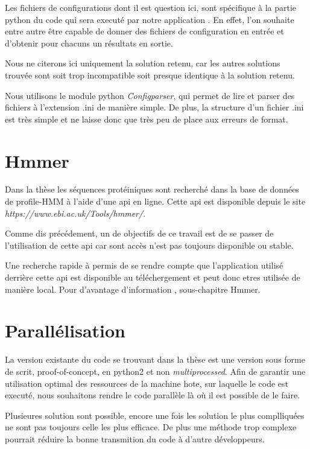 Les fichiers de configurations dont il est question ici, sont spécifique à la partie python du code qui sera executé par notre application . En effet, l'on souhaite entre autre être capable de donner des fichiers de configuration en entrée et d'obtenir pour chacuns un résultats en sortie.

Nous ne citerons ici uniquement la solution retenu, car les autres solutions trouvée sont soit trop incompatible soit presque identique à la solution retenu.

Nous utilisons le module python \emph{Configparser}, qui permet de lire et parser des fichiers à l'extension .ini de manière simple. De plus, la structure d'un fichier .ini est très simple et ne laisse donc que très peu de place aux erreurs de format.
 
 
\section{Hmmer}
Dans la thèse \thLeite les séquences protéiniques sont recherché dans la base de données de profile-HMM à l'aide d'une \gls{api} en ligne. Cette \gls{api} est disponible depuis le site \emph{https://www.ebi.ac.uk/Tools/hmmer/}. 

Comme dis précédement, un de objectifs de ce travail est de se passer de l'utilisation de cette \gls{api} car sont accès n'est pas toujours disponible ou stable.

Une recherche rapide à permis de se rendre compte que l'application utilisé derrière cette \gls{api} est disponible au téléchergement et peut donc etres utilisée de manière local. Pour d'avantage d'information , sous-chapitre Hmmer.


\section{Parallélisation}

La version existante du code se trouvant dans la thèse \thLeite est une version sous forme de scrit, proof-of-concept, en python2 et non \emph{multiprocessed}. Afin de garantir une utilisation optimal des ressources de la machine hote, sur laquelle le code est executé, nous souhaitons rendre le code parallèle là où il est possible de le faire.

Plusieures solution sont possible, encore une fois les solution le plus complliquées ne sont pas toujours celle les plus efficace. De plus une méthode trop complexe pourrait réduire la bonne transmition du code à d'autre développeurs.


